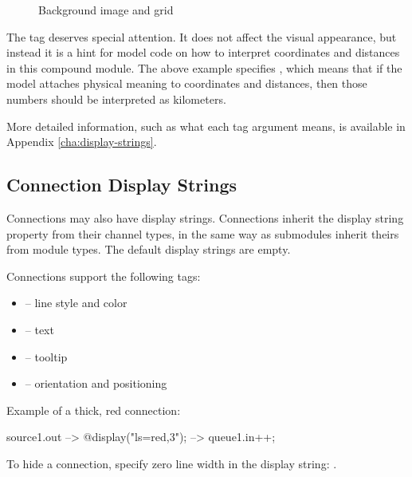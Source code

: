 \begin{figure}[htbp]
  \begin{center}
    \caption{Background image and grid}
    \label{fig:graphics-bgtags}
  \end{center}
\end{figure}

The  tag deserves special attention. It does not affect
the visual appearance, but instead it is a hint for model code
on how to interpret coordinates and distances in this compound
module. The above example specifies , which means
that if the model attaches physical meaning to coordinates and
distances, then those numbers should be interpreted as kilometers.

More detailed information, such as what each tag argument means, is
available in Appendix \ref{cha:display-strings}.


\subsection{Connection Display Strings}
\label{sec:graphics:connection-displaystrings}

Connections may also have display strings. Connections inherit the
display string property from their channel types, in the same way as
submodules inherit theirs from module types. The default display
strings are empty.

Connections support the following tags:

\begin{itemize}
  \item {} -- line style and color
  \item {} -- text
  \item {} -- tooltip
  \item {} -- orientation and positioning
\end{itemize}

Example of a thick, red connection:
\begin{ned}
source1.out --> { @display("ls=red,3"); } --> queue1.in++;
\end{ned}

\begin{center}
\end{center}

\begin{note}
To hide a connection, specify zero line width in the display string:
.
\end{note}

